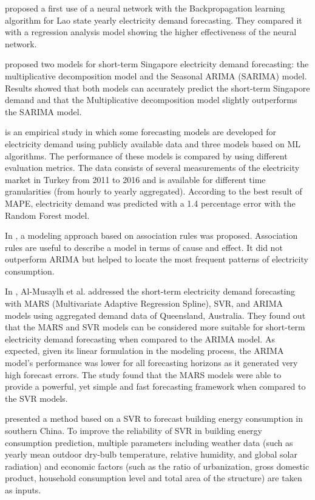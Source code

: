 \cite{5686767} proposed a first use of a neural network with the Backpropagation learning algorithm for Lao state yearly electricity demand forecasting.
They compared it with a regression analysis model showing the higher effectiveness of the neural network.

\cite{5518553} proposed two models for short-term Singapore electricity demand forecasting: the multiplicative decomposition model and the Seasonal ARIMA (SARIMA) model.
Results showed that both models can accurately predict the short-term Singapore demand and that the Multiplicative decomposition model slightly outperforms the SARIMA model.

\cite{8093428} is an empirical study in which some forecasting models are developed for electricity demand using publicly available data and three models based on ML algorithms.
The performance of these models is compared by using different evaluation metrics.
The data consists of several measurements of the electricity market in Turkey from 2011 to 2016 and is available for different time granularities (from hourly to yearly aggregated).
According to the best result of MAPE, electricity demand was predicted with a 1.4 percentage error with the Random Forest model.

In \cite{9046493}, a modeling approach based on association rules was proposed.
Association rules are useful to describe a model in terms of cause and effect.
It did not outperform ARIMA but helped to locate the most frequent patterns of electricity consumption.

In \cite{ALMUSAYLH20181}, Al-Musaylh et al. addressed the short-term electricity demand forecasting with MARS (Multivariate Adaptive Regression Spline), SVR, and ARIMA models using aggregated demand data of Queensland, Australia.
They found out that the MARS and SVR models can be considered more suitable for short-term electricity demand forecasting when compared to the ARIMA model.
As expected, given its linear formulation in the modeling process, the ARIMA model’s performance was lower for all forecasting horizons as it generated very high forecast errors.
The study found that the MARS models were able to provide a powerful, yet simple and fast forecasting framework when compared to the SVR models.

\cite{MA20193433} presented a method based on a SVR to forecast building energy consumption in southern China.
To improve the reliability of SVR in building energy consumption prediction, multiple parameters including weather data (such as yearly mean outdoor dry-bulb temperature, relative humidity, and global solar radiation) and economic factors (such as the ratio of urbanization, gross domestic product, household consumption level and total area of the structure) are taken as inputs.

